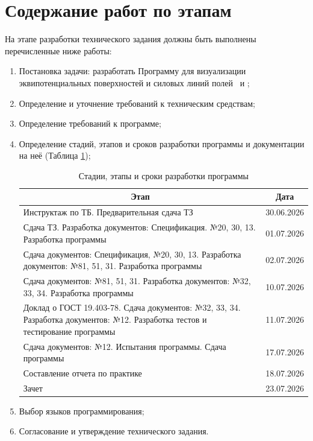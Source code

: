\documentclass[14pt,a4paper,final]{extreport}
\begin{document}
\section{Содержание работ по этапам}
На этапе разработки технического задания должны быть выполнены перечисленные ниже
работы:
\begin{enumerate}[label=\asbuk*),ref=\asbuk*]
	\item Постановка задачи: разработать Программу для визуализации эквипотенциальных поверхностей и силовых линий полей \fieldA\ и \fieldB; 
	\item Определение и уточнение требований к техническим средствам;
	\item Определение требований к программе;
	\item Определение стадий, этапов и сроков разработки программы и документации на неё (Таблица \ref{table:stages});
	\begin{table}[h!]
	\centering
	\begin{tabular}{|p{10cm}|c|} 
		\hline
		\multicolumn{1}{|c|}{Этап} & \multicolumn{1}{c|}{Дата} \\ [0.5ex]
		\hline
		Инструктаж по ТБ. Предварительная сдача ТЗ &
		30.06.2026
	
		\\ \hline
		Сдача ТЗ. Разработка документов: Спецификация. №20, 30, 13. Разработка программы &
		01.07.2026
		
		\\ \hline
		Сдача документов: Спецификация, №20, 30, 13. Разработка документов: №81, 51, 31. Разработка программы &
		02.07.2026
		\\ \hline
		Сдача документов: №81, 51, 31. Разработка документов: №32, 33, 34. Разработка программы &
		10.07.2026

		\\ \hline
		Доклад о ГОСТ 19.403-78. Сдача документов: №32, 33, 34. Разработка документов: №12. Разработка тестов и тестирование программы &
		11.07.2026

		\\ \hline
		Сдача документов: №12. Испытания программы. Сдача программы &
		17.07.2026
		\\ \hline
		Составление отчета по практике &
		18.07.2026

		\\ \hline
		Зачет &
		23.07.2026
		
		\\ [1ex] 
		\hline
	\end{tabular}
	\caption{Стадии, этапы и сроки разработки программы}
	\label{table:stages}
\end{table}

	\item Выбор языков программирования;
	\item Согласование и утверждение технического задания.
\end{enumerate}
\end{document}
